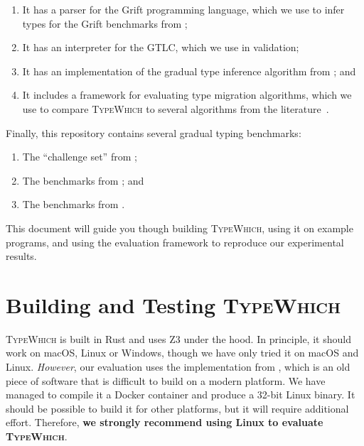\documentclass{article}
\newcommand{\system}{\textsc{TypeWhich}\xspace}
\begin{document}
\begin{enumerate}

  \item It has a parser for the Grift programming language, which we use to
  infer types for the Grift benchmarks from \citet{kuhlenschmidt:grift};

  \item It has an interpreter for the GTLC, which we use in validation;
  
  \item It has an implementation of the gradual type inference algorithm
  from \citet{rastogi:gti}; and

  \item It includes a framework for evaluating type migration algorithms,
  which we use to compare \system to several algorithms from the
  literature~\cite{rastogi:gti,campora:migrating,migeed:decidable,siek:gti}.

\end{enumerate}
%
Finally, this repository contains several gradual typing benchmarks:
%
\begin{enumerate}

     \item The ``challenge set'' from \citet{typewhich};
     
     \item The benchmarks from \citet{migeed:decidable}; and
     
     \item The benchmarks from \citet{kuhlenschmidt:grift}.

\end{enumerate}

This document will guide you though building \system, using it on example
programs, and using the evaluation framework to reproduce our experimental
results.

\section{Building and Testing \system}

\system is built in Rust and uses Z3 under the hood. In principle, it should
work on macOS, Linux or Windows, though we have only tried it on macOS and
Linux. \emph{However}, our evaluation uses the implementation from
\citet{siek:gti}, which is an old piece of software that is difficult to build
on a modern platform. We have managed to compile it a Docker container and
produce a 32-bit Linux binary. It should be possible to build it for other
platforms, but it will require additional effort. Therefore, \textbf{we strongly
recommend using Linux to evaluate \system}.
\end{document}
